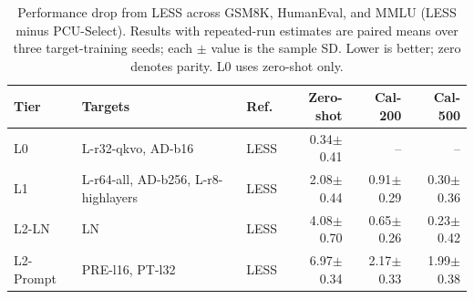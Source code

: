\begin{table}[t]
\centering
\small
\setlength{\tabcolsep}{4pt}
\begin{tabular}{lllrrr}
\toprule
Tier & Targets & Ref. & Zero-shot & Cal-200 & Cal-500 \\
\midrule
L0 & L-r32-qkvo, AD-b16 & LESS & 0.34$\pm$0.41 & -- & -- \\
L1 & L-r64-all, AD-b256, L-r8-highlayers & LESS & 2.08$\pm$0.44 & 0.91$\pm$0.29 & 0.30$\pm$0.36 \\
L2-LN & LN & LESS & 4.08$\pm$0.70 & 0.65$\pm$0.26 & 0.23$\pm$0.42 \\
L2-Prompt & PRE-l16, PT-l32 & LESS & 6.97$\pm$0.34 & 2.17$\pm$0.33 & 1.99$\pm$0.38 \\
\bottomrule
\end{tabular}
\caption{Performance drop from LESS across GSM8K, HumanEval, and MMLU (LESS minus PCU-Select). Results with repeated-run estimates are paired means over three target-training seeds; each $\pm$ value is the sample SD. Lower is better; zero denotes parity. L0 uses zero-shot only.}
\label{tab:ood-levels}
\end{table}
